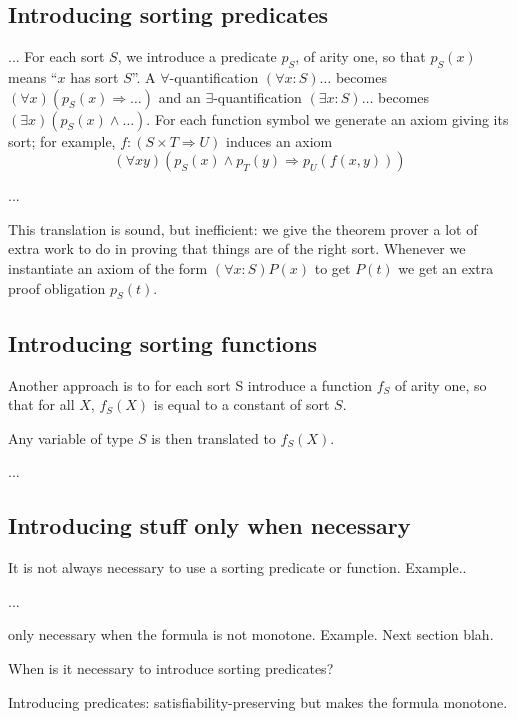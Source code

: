\subsection{Introducing sorting predicates}

... For each sort $S$, we introduce a predicate $p_S$, of arity one,
so that $p_S(x)$ means ``$x$ has sort $S$''. A
$\forall$-quantification $(\forall x:S)\ldots$ becomes $(\forall
x)(p_S(x) \Rightarrow \ldots)$ and an $\exists$-quantification
$(\exists x:S)\ldots$ becomes $(\exists x)(p_S(x) \land \ldots)$. For
each function symbol we generate an axiom giving its sort; for
example, $f : (S \times T \Rightarrow U)$ induces an axiom
\begin{displaymath}
(\forall x y)(p_S(x) \land p_T(y) \Rightarrow p_U(f(x, y)))
\end{displaymath}

...

This translation is sound, but inefficient: we give the theorem prover
a lot of extra work to do in proving that things are of the right
sort. Whenever we instantiate an axiom of the form $(\forall
x:S)P(x)$ to get $P(t)$ we get an extra proof obligation $p_S(t)$.

\subsection{Introducing sorting functions}

Another approach is to for each sort S introduce a function $f_S$ of
arity one, so that for all $X$, $f_S(X)$ is equal to a constant of sort $S$. 

Any variable of type $S$ is then translated to $f_S(X)$.

...

\subsection{Introducing stuff only when necessary}

It is not always necessary to use a sorting predicate or function.
Example..

...

only necessary when the formula is not monotone. Example.
Next section blah.

When is it necessary to introduce sorting predicates?

Introducing predicates: satisfiability-preserving but makes the
formula monotone.

